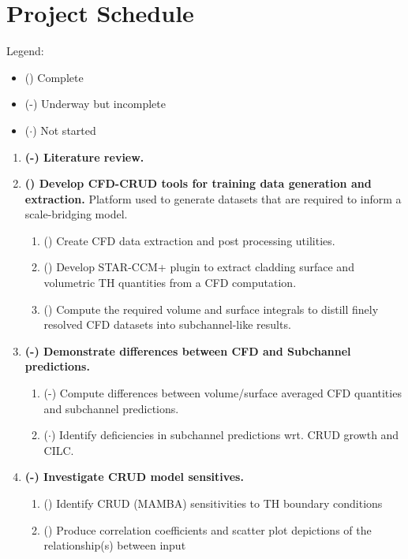 \pagebreak
\section*{Project Schedule}

Legend:
\begin{itemize}
    \item (\checkmark)  Complete
    \item (\checkmark-)  Underway but incomplete
    \item ($\cdot$)  Not started
\end{itemize}


\begin{enumerate}
\item \textbf{(\checkmark-) Literature review.}
\item \textbf{(\checkmark) Develop CFD-CRUD tools for training data generation and extraction.}
          Platform used to generate datasets that are
          required to inform a scale-bridging model.
    \begin{enumerate}
        \item (\checkmark) Create CFD data extraction and post processing utilities.
        \item (\checkmark) Develop STAR-CCM+ plugin to extract cladding surface and volumetric TH quantities from a CFD computation.
        \item (\checkmark) Compute the required volume and surface integrals to
              distill finely resolved CFD datasets into subchannel-like results.
    \end{enumerate}
\item \textbf{(\checkmark-) Demonstrate differences between CFD and Subchannel predictions.}
    \begin{enumerate}
        \item (\checkmark-) Compute differences between volume/surface averaged CFD quantities and subchannel predictions.
        \item ($\cdot$) Identify deficiencies in subchannel predictions wrt. CRUD growth and CILC.
    \end{enumerate}
\item \textbf{(\checkmark-) Investigate CRUD model sensitives.}
    \begin{enumerate}
        \item (\checkmark) Identify CRUD (MAMBA) sensitivities to TH boundary conditions
        \item (\checkmark) Produce correlation coefficients and scatter plot depictions of the relationship(s) between input

\end{enumerate}
\end{enumerate}
